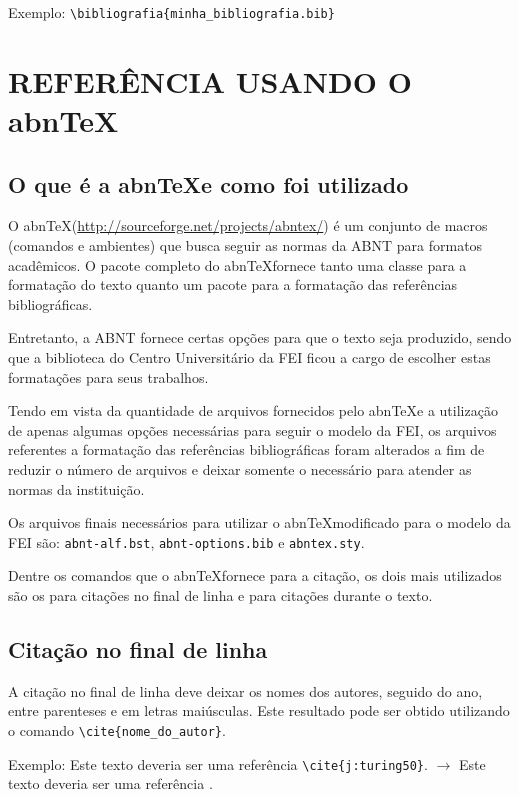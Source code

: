 \documentclass{fei}
\begin{document}
    Exemplo: \verb+\bibliografia{minha_bibliografia.bib}+

\chapter{REFERÊNCIA USANDO O abn\TeX}\label{chap:referencia}

    \section{O que é a abn\TeX e como foi utilizado}

    O abn\TeX (\href{http://sourceforge.net/projects/abntex/}{http://sourceforge.net/projects/abntex/}) é um conjunto de macros (comandos e ambientes) que busca seguir as normas da ABNT para formatos acadêmicos. O pacote completo do abn\TeX fornece tanto uma classe para a formatação do texto quanto um pacote para a formatação das referências bibliográficas.

    Entretanto, a ABNT fornece certas opções para que o texto seja produzido, sendo que a biblioteca do Centro Universitário da FEI ficou a cargo de escolher estas formatações para seus trabalhos.

    Tendo em vista da quantidade de arquivos fornecidos pelo abn\TeX e a utilização de apenas algumas opções necessárias para seguir o modelo da FEI, os arquivos referentes a formatação das referências bibliográficas foram alterados a fim de reduzir o número de arquivos e deixar somente o necessário para atender as normas da instituição.

    Os arquivos finais necessários para utilizar o abn\TeX modificado para o modelo da FEI são: \texttt{abnt-alf.bst}, \texttt{abnt-options.bib} e \texttt{abntex.sty}.

    Dentre os comandos que o abn\TeX fornece para a citação, os dois mais utilizados são os para citações no final de linha e para citações durante o texto.

    \section{Citação no final de linha}
    A citação no final de linha deve deixar os nomes dos autores, seguido do ano, entre parenteses e em letras maiúsculas. Este resultado pode ser obtido utilizando o comando \verb+\cite{nome_do_autor}+.

    Exemplo: Este texto deveria ser uma referência \verb+\cite{j:turing50}+. $\to$ Este texto deveria ser uma referência \cite{j:turing50}.
\end{document}
